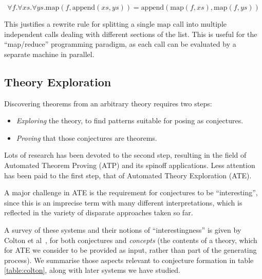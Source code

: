 \begin{equation} \label{eq:mapreduce}
  \forall f. \forall xs. \forall ys. \text{map}(f, \text{append}(xs, ys)) = \text{append}(\text{map}(f, xs), \text{map}(f, ys))
\end{equation}

This justifies a rewrite rule for splitting a single $\text{map}$ call into
multiple independent calls dealing with different sections of the list. This is
useful for the ``map/reduce'' programming paradigm, as each call can be
evaluated by a separate machine in parallel.

\subsection{Theory Exploration}
\label{sec:te}

Discovering theorems from an arbitrary theory requires two steps:

\begin{itemize}
\item \emph{Exploring} the theory, to find patterns suitable for posing as
  conjectures.
\item \emph{Proving} that those conjectures are theorems.
\end{itemize}

Lots of research has been devoted to the second step, resulting in the field of
Automated Theorem Proving (ATP) and its spinoff applications. Less attention has
been paid to the first step, that of Automated Theory Exploration (ATE).

A major challenge in ATE is the requirement for conjectures to be
``interesting'', since this is an imprecise term with many different
interpretations, which is reflected in the variety of disparate approaches taken
so far.

A survey of these systems and their notions of ``interestingness'' is given by
Colton et al~\cite{colton2000notion}, for both conjectures and \emph{concepts}
(the contents of a theory, which for ATE we consider to be provided as input,
rather than part of the generating process). We summarise those aspects relevant
to conjecture formation in table \ref{table:colton}, along with later systems
we have studied.

